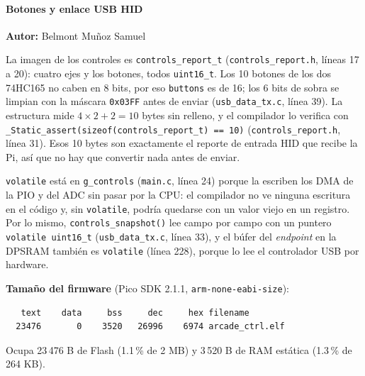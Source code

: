 \paragraph{Botones y enlace USB HID}
\textbf{Autor:} Belmont Muñoz Samuel

La imagen de los controles es \texttt{controls\_report\_t} (\texttt{controls\_report.h}, líneas 17 a 20):
cuatro ejes y los botones, todos \texttt{uint16\_t}. Los 10 botones de los dos 74HC165 no caben en 8 bits,
por eso \texttt{buttons} es de 16; los 6 bits de sobra se limpian con la máscara \texttt{0x03FF} antes de enviar
(\texttt{usb\_data\_tx.c}, línea 39). La estructura mide $4 \times 2 + 2 = 10$ bytes sin relleno, y el compilador
lo verifica con \texttt{\_Static\_assert(sizeof(controls\_report\_t) == 10)} (\texttt{controls\_report.h}, línea 31).
Esos 10 bytes son exactamente el reporte de entrada HID que recibe la Pi, así que no hay que convertir nada antes de enviar.

\texttt{volatile} está en \texttt{g\_controls} (\texttt{main.c}, línea 24) porque la escriben los DMA de la PIO y del
ADC sin pasar por la CPU: el compilador no ve ninguna escritura en el código y, sin \texttt{volatile}, podría
quedarse con un valor viejo en un registro. Por lo mismo, \texttt{controls\_snapshot()} lee campo por campo con un
puntero \texttt{volatile uint16\_t} (\texttt{usb\_data\_tx.c}, línea 33), y el búfer del \textit{endpoint} en la DPSRAM
también es \texttt{volatile} (línea 228), porque lo lee el controlador USB por hardware.

\textbf{Tamaño del firmware} (Pico SDK 2.1.1, \texttt{arm-none-eabi-size}):
\begin{lstlisting}
   text    data     bss     dec     hex filename
  23476       0    3520   26996    6974 arcade_ctrl.elf
\end{lstlisting}
Ocupa 23\,476 B de Flash (1.1\,\% de 2 MB) y 3\,520 B de RAM estática (1.3\,\% de 264 KB).
